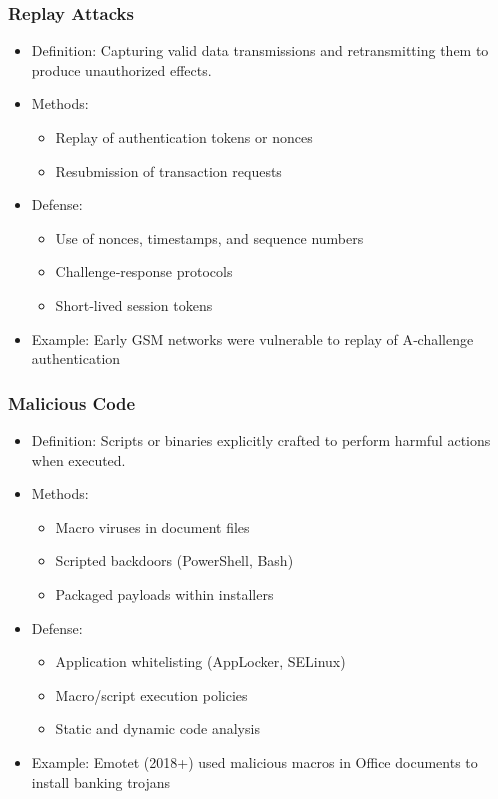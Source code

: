 \documentclass[11pt]{article}
\begin{document}
\subsubsection{Replay Attacks}
\label{sec:org36081a6}
\begin{itemize}
\item Definition: Capturing valid data transmissions and retransmitting them to produce unauthorized effects.
\item Methods:
\begin{itemize}
\item Replay of authentication tokens or nonces
\item Resubmission of transaction requests
\end{itemize}
\item Defense:
\begin{itemize}
\item Use of nonces, timestamps, and sequence numbers
\item Challenge‑response protocols
\item Short‐lived session tokens
\end{itemize}
\item Example: Early GSM networks were vulnerable to replay of A‑challenge authentication
\end{itemize}
\subsubsection{Malicious Code}
\label{sec:org20f0b4b}
\begin{itemize}
\item Definition: Scripts or binaries explicitly crafted to perform harmful actions when executed.
\item Methods:
\begin{itemize}
\item Macro viruses in document files
\item Scripted backdoors (PowerShell, Bash)
\item Packaged payloads within installers
\end{itemize}
\item Defense:
\begin{itemize}
\item Application whitelisting (AppLocker, SELinux)
\item Macro/script execution policies
\item Static and dynamic code analysis
\end{itemize}
\item Example: Emotet (2018+) used malicious macros in Office documents to install banking trojans
\end{itemize}
\end{document}
